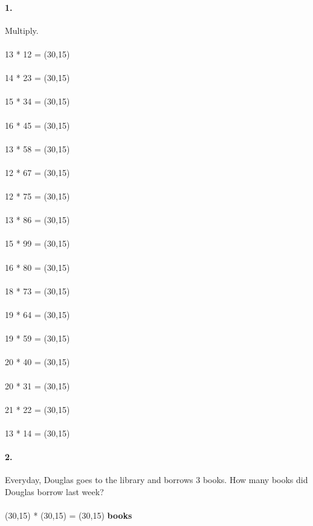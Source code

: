 \documentclass[12pt]{article}
\begin{document}
\paragraph{1.}
Multiply. \\
\\
13 * 12 = \framebox(30,15){}
\\
\\
14 * 23 = \framebox(30,15){}
\\
\\
15 * 34 = \framebox(30,15){}
\\
\\
16 * 45 = \framebox(30,15){}
\\
\\
13 * 58 = \framebox(30,15){}
\\
\\
12 * 67 = \framebox(30,15){}
\\
\\
12 * 75 = \framebox(30,15){}
\\
\\
13 * 86 = \framebox(30,15){}
\\
\\
15 * 99 = \framebox(30,15){}
\\
\\
16 * 80 = \framebox(30,15){}
\\
\\
18 * 73 = \framebox(30,15){}
\\
\\
19 * 64 = \framebox(30,15){}
\\
\\
19 * 59 = \framebox(30,15){}
\\
\\
20 * 40 = \framebox(30,15){}
\\
\\
20 * 31 = \framebox(30,15){}
\\
\\
21 * 22 = \framebox(30,15){}
\\
\\
13 * 14 = \framebox(30,15){}

\newpage

\paragraph{2.}
Everyday, Douglas goes to the library and borrows 3 books. How many books did Douglas borrow last week?
\\
\\
\framebox(30,15){} * \framebox(30,15){} = \framebox(30,15){} \textbf{books}
\\
\\
\end{document}
